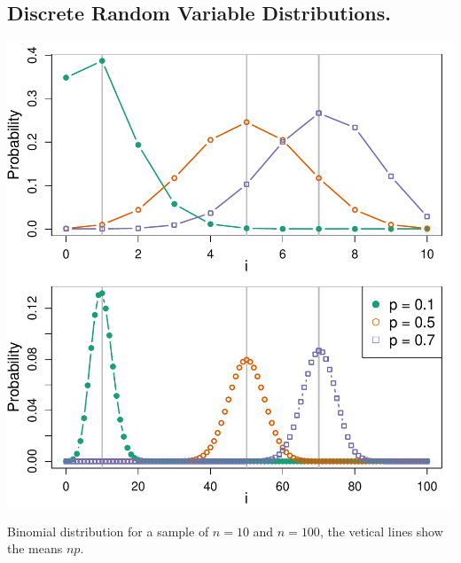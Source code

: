 \subsection{Discrete Random Variable Distributions.}

 \begin{marginfigure}
 \begin{center}
   \includegraphics[width=\textwidth]{math_background/dist_pics/Binomial.pdf}\end{center}
 \caption{Binomial distribution for a sample of $n=10$ and $n=100$,
   the vetical lines show the means $np$. }\label{Fig:binomial}
 \end{marginfigure}

